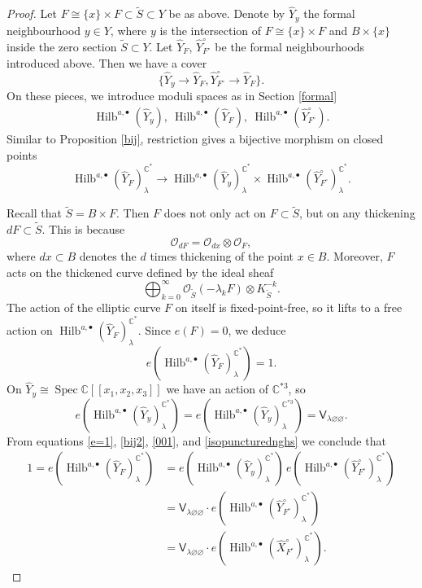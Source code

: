\documentclass{amsart}
\theoremstyle{definition}
\newcommand{\CC} {\mathbb{C}}          %
\renewcommand{\O}{\mathcal{O}}
\newcommand{\sfV}{\mathsf{V}}
\newcommand{\Hilb}{\operatorname{Hilb}}
\newcommand{\Spec}{\operatorname{Spec}}
\newcommand{\Xhat}{\widehat{X}}
\begin{document}
\begin{proof}
Let $F \cong \{x\} \times F \subset \tilde{S} \subset Y$ be as above. Denote by $\widehat{Y}_{y}$ the formal neighbourhood $y \in Y$, where $y$ is the intersection of $F \cong \{x\} \times F$ and $B \times \{x\}$ inside the zero section $\tilde{S} \subset Y$. Let $\widehat{Y}_F$, $\widehat{Y}^{\circ}_{F^\circ}$ be the formal neighbourhoods introduced above. Then we have a cover
$$
\{\widehat{Y}_y \rightarrow \widehat{Y}_F, \widehat{Y}^{\circ}_{F^\circ} \rightarrow \widehat{Y}_F\}. 
$$
On these pieces, we introduce moduli spaces as in Section \ref{formal}
\begin{align*}
\Hilb^{a,\bullet}(\widehat{Y}_y), \ \Hilb^{a,\bullet}(\widehat{Y}_F), \ \Hilb^{a,\bullet}(\widehat{Y}^{\circ}_{F^\circ}).
\end{align*}
Similar to Proposition \ref{bij}, restriction gives a bijective morphism on closed points
\begin{equation} \label{bij2}
\Hilb^{a,\bullet}(\widehat{Y}_F)^{\CC^*}_{\lambda} \rightarrow \Hilb^{a,\bullet}(\widehat{Y}_y)^{\CC^*}_{\lambda} \times \Hilb^{a,\bullet}(\widehat{Y}^{\circ}_{F^\circ})^{\CC^*}_{\lambda}.
\end{equation}

Recall that $\tilde{S} = B \times F$. Then $F$ does not only act on $F \subset \tilde{S}$, but on any thickening $d F \subset \tilde{S}$. This is because
$$
\O_{dF} = \O_{d x} \otimes \O_F,
$$
where $dx \subset B$ denotes the $d$ times thickening of the point $x \in B$. Moreover, $F$ acts on the thickened curve defined by the ideal sheaf
$$
\bigoplus_{k=0}^{\infty} \O_{\tilde{S}}(-\lambda_k F) \otimes K_{\tilde{S}}^{-k}.
$$
The action of the elliptic curve $F$ on itself is fixed-point-free, so it lifts to a free action on $\Hilb^{a,\bullet}(\widehat{Y}_F)^{\CC^*}_{\lambda}$. Since $e(F) = 0$, we deduce
\begin{equation} \label{e=1}
e(\Hilb^{a,\bullet}(\widehat{Y}_F)^{\CC^*}_{\lambda}) = 1.
\end{equation}
On $\widehat{Y}_y \cong \Spec \CC[\![x_1,x_2,x_3]\!]$ we have an action of $\CC^{*3}$, so
\begin{equation} \label{001}
e(\Hilb^{a,\bullet}(\widehat{Y}_y)^{\CC^*}_{\lambda}) = e(\Hilb^{a,\bullet}(\widehat{Y}_y)^{\CC^{*3}}_{\lambda}) = \sfV_{\lambda\varnothing\varnothing}.
\end{equation}
From equations \eqref{e=1}, \eqref{bij2}, \eqref{001}, and \eqref{isopuncturednghs} we conclude that
\begin{align*}
1=e(\Hilb^{a,\bullet}(\widehat{Y}_F)^{\CC^*}_{\lambda}) &= e( \Hilb^{a,\bullet}(\widehat{Y}_y)^{\CC^*}_{\lambda}) \, e(\Hilb^{a,\bullet}(\widehat{Y}^{\circ}_{F^\circ})^{\CC^*}_{\lambda}) \\
&=  \sfV_{\lambda\varnothing\varnothing} \cdot e(\Hilb^{a,\bullet}(\widehat{Y}^{\circ}_{F^\circ})^{\CC^*}_{\lambda}) \\
&=  \sfV_{\lambda\varnothing\varnothing} \cdot e(\Hilb^{a,\bullet}(\Xhat ^{\circ}_{F^\circ})^{\CC^*}_{\lambda}).
\end{align*}


\end{proof}
\end{document}
